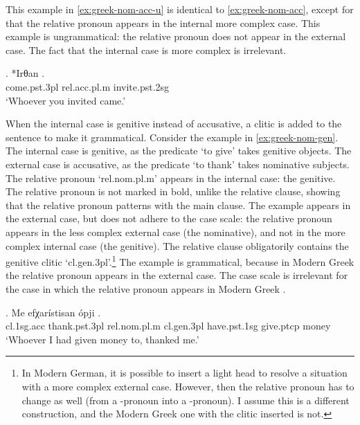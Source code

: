 This example in \ref{ex:greek-nom-acc-u} is identical to \ref{ex:greek-nom-acc}, except for that the relative pronoun appears in the internal  more complex case. This example is ungrammatical: the relative pronoun does not appear in the external case. The fact that the internal case is more complex is irrelevant.

\exg. *Irθan  .\\
come.\ac{pst}.3\ac{pl} \ac{rel}.\ac{acc}.\ac{pl}.\ac{m} invite.\ac{pst}.2\ac{sg}\\
`Whoever you invited came.'\label{ex:greek-nom-acc-u}

When the internal case is genitive instead of accusative, a clitic is added to the sentence to make it grammatical.
Consider the example in \ref{ex:greek-nom-gen}.
The internal case is genitive, as the predicate  `to give' takes genitive objects.
The external case is accusative, as the predicate  `to thank' takes nominative subjects.
The relative pronoun  `\ac{rel}.\ac{nom}.\ac{pl}.\ac{m}' appears in the internal case: the genitive. The relative pronoun is not marked in bold, unlike the relative clause, showing that the relative pronoun patterns with the main clause.
The example appears in the external case, but does not adhere to the case scale: the relative pronoun appears in the less complex external case (the nominative), and not in the more complex internal case (the genitive). The relative clause obligatorily contains the genitive clitic  `\ac{cl}.\ac{gen}.3\ac{pl}'.\footnote{
In Modern German, it is possible to insert a light head to resolve a situation with a more complex external case. However, then the relative pronoun has to change as well (from a -pronoun into a -pronoun). I assume this is a different construction, and the Modern Greek one with the clitic inserted is not.
}
The example is grammatical, because in Modern Greek the relative pronoun appears in the external case. The case scale is irrelevant for the case in which the relative pronoun appears in Modern Greek .

\exg. Me efχarístisan ópji    .\\
 \ac{cl}.1\ac{sg}.\ac{acc} thank.\ac{pst}.3\ac{pl} \ac{rel}.\ac{nom}.\ac{pl}.\ac{m} \ac{cl}.\ac{gen}.3\ac{pl} have.\ac{pst}.1\ac{sg} give.\ac{ptcp} money\\
 `Whoever I had given money to, thanked me.'\label{ex:greek-nom-gen}


